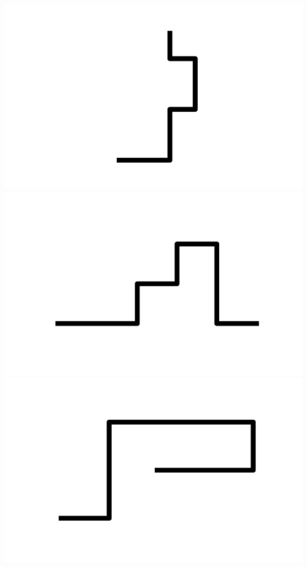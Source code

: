 \documentclass[]{report}
\begin{document}
\includegraphics[scale=.1]{pictures/21/state_cluster_shapes_124.pdf} 
\includegraphics[scale=.1]{pictures/21/state_cluster_shapes_125.pdf} 
\includegraphics[scale=.1]{pictures/21/state_cluster_shapes_126.pdf} 
\end{document}
